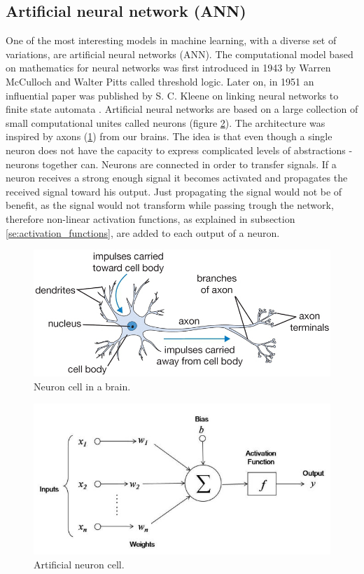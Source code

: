 \documentclass[times, utf8, diplomski]{fer}
\begin{document}
\subsection{Artificial neural network (ANN)}
One of the most interesting models in machine learning, with a diverse set of variations, are artificial neural networks (ANN). The computational model based on mathematics for neural networks was first introduced in 1943 by Warren McCulloch and Walter Pitts \citep{mcculloch_logical_1943}  called threshold logic. Later on, in 1951 an influential paper was published by S. C. Kleene on linking neural networks to finite state automata \citep{kleene_representation_1951}. Artificial neural networks are based on a large collection of small computational unites called neurons (figure  \ref{fig:ann_neuron}). The architecture was inspired by axons (\ref{fig:neuron}) from our brains. The idea is that even though a single neuron does not have the capacity to express complicated levels of abstractions - neurons together can. Neurons are connected in order to transfer signals. If a neuron receives a strong enough signal it becomes activated and propagates the received signal toward his output. Just propagating the signal would not be of benefit, as the signal would not transform while passing trough the network, therefore non-linear activation functions, as explained in subsection \ref{se:activation_functions}, are added to each output of a neuron.

\begin{figure}
  \includegraphics[width=\linewidth]{figures/axon.png}
  \caption{Neuron cell in a brain.}
  \label{fig:neuron}
\end{figure}

\begin{figure}
  \includegraphics[width=\linewidth]{figures/neuron.jpg}
  \caption{Artificial neuron cell.}
  \label{fig:ann_neuron}
\end{figure}
\end{document}
